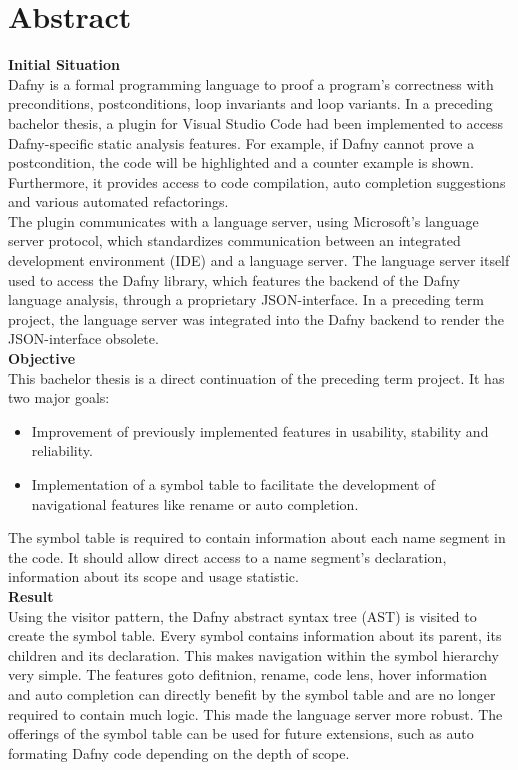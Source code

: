 \section{Abstract}
\label{section:abstract}

\textbf{Initial Situation}\\
Dafny is a formal programming language to proof a program's correctness with preconditions, postconditions, loop invariants and loop variants.
In a preceding bachelor thesis, a plugin for Visual Studio Code had been implemented to access Dafny-specific static analysis features.
For example, if Dafny cannot prove a postcondition, the code will be highlighted and a counter example is shown.
Furthermore, it provides access to code compilation, auto completion suggestions and various automated refactorings.\\

The plugin communicates with a language server, using Microsoft's language server protocol, which standardizes communication between an integrated development environment (IDE) and a language server. 
The language server itself used to access the Dafny library, which features the backend of the Dafny language analysis, through a proprietary JSON-interface.
In a preceding term project, the language server was integrated into the Dafny backend to render the JSON-interface obsolete.\\

\textbf{Objective}\\
This bachelor thesis is a direct continuation of the preceding term project.
It has two major goals:
\begin{itemize}
    \item Improvement of previously implemented features in usability, stability and reliability.
    \item Implementation of a symbol table to facilitate the development of navigational features like rename or auto completion.
\end{itemize}
The symbol table is required to contain information about each name segment in the code.
It should allow direct access to a name segment's declaration, information about its scope and usage statistic.\\

\textbf{Result}\\
Using the visitor pattern, the Dafny abstract syntax tree (AST) is visited to create the symbol table.
Every symbol contains information about its parent, its children and its declaration.
This makes navigation within the symbol hierarchy  very simple.
The features goto defitnion, rename, code lens, hover information and auto completion can directly benefit by the symbol table and are no longer required to contain much logic.
This made the language server more robust.
The offerings of the symbol table can be used for future extensions, such as auto formating Dafny code depending on the depth of scope.\\


